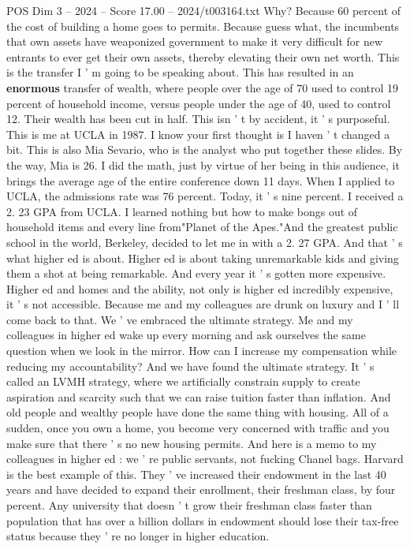 \begin{textsample}{POS Dim 3 – 2024 – Score 17.00 – 2024/t003164.txt}
Why?
Because 60 percent of the cost of building a home goes to permits.
Because guess what, the incumbents that own assets have weaponized government to make it very difficult for new entrants to ever get their own assets, thereby elevating their own net worth.
This is the transfer I ' m going to be speaking about.
This has resulted in an \textbf{enormous} transfer of wealth, where people over the age of 70 used to control 19 percent of household income, versus people under the age of 40, used to control 12.
Their wealth has been cut in half.
This isn ' t by accident, it ' s purposeful.
This is me at UCLA in 1987.
I know your first thought is I haven ' t changed a bit.
This is also Mia Sevario, who is the analyst who put together these slides.
By the way, Mia is 26.
I did the math, just by virtue of her being in this audience, it brings the average age of the entire conference down 11 days.
When I applied to UCLA, the admissions rate was 76 percent.
Today, it ' s nine percent.
I received a 2. 23 GPA from UCLA.
I learned nothing but how to make bongs out of household items and every line from"Planet of the Apes."And the greatest public school in the world, Berkeley, decided to let me in with a 2. 27 GPA.
And that ' s what higher ed is about.
Higher ed is about taking unremarkable kids and giving them a shot at being remarkable.
And every year it ' s gotten more expensive.
Higher ed and homes and the ability, not only is higher ed incredibly expensive, it ' s not accessible.
Because me and my colleagues are drunk on luxury and I ' ll come back to that.
We ' ve embraced the ultimate strategy.
Me and my colleagues in higher ed wake up every morning and ask ourselves the same question when we look in the mirror.
How can I increase my compensation while reducing my accountability?
And we have found the ultimate strategy.
It ' s called an LVMH strategy, where we artificially constrain supply to create aspiration and scarcity such that we can raise tuition faster than inflation.
And old people and wealthy people have done the same thing with housing.
All of a sudden, once you own a home, you become very concerned with traffic and you make sure that there ' s no new housing permits.
And here is a memo to my colleagues in higher ed : we ' re public servants, not fucking Chanel bags.
Harvard is the best example of this.
They ' ve increased their endowment in the last 40 years and have decided to expand their enrollment, their freshman class, by four percent.
Any university that doesn ' t grow their freshman class faster than population that has over a billion dollars in endowment should lose their tax-free status because they ' re no longer in higher education.

\end{textsample}
